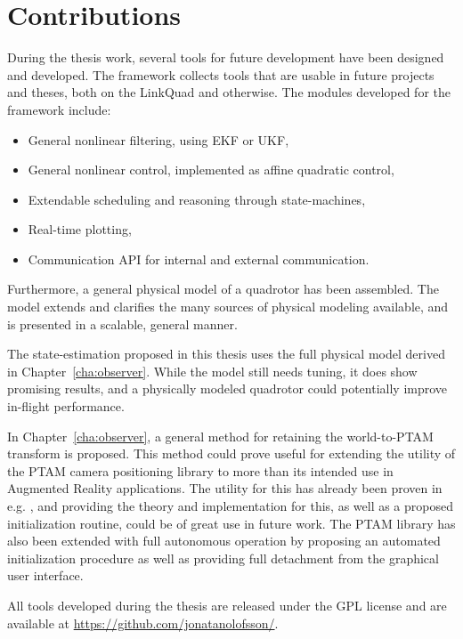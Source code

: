 \section{Contributions}
    During the thesis work, several tools for future development have been
    designed and developed. The \crap framework collects tools that are usable in future
    projects and theses, both on the LinkQuad and otherwise.
    The modules developed for the \crap framework include:
    \begin{itemize}
        \item General nonlinear filtering, using EKF or UKF,
        \item General nonlinear control, implemented as affine quadratic control,
        \item Extendable scheduling and reasoning through state-machines,
        \item Real-time plotting,
        \item Communication API for internal and external communication.
    \end{itemize}

    Furthermore, a general physical model of a quadrotor has been assembled.
    The model extends and clarifies the many sources of physical modeling
    available, and is presented in a scalable, general manner.

    The state-estimation proposed in this thesis uses the full physical model
    derived in Chapter~\ref{cha:observer}. While the model still needs
    tuning, it does show promising results, and a physically modeled
    quadrotor could potentially improve in-flight performance.

    In Chapter~\ref{cha:observer}, a general method for retaining
    the world-to-PTAM transform is proposed.
    This method could prove useful for extending the utility of the PTAM
    camera positioning library to more than its intended use in Augmented Reality applications.
    The utility for this has already been proven in e.g. \citep{weiss11monocular},
    and providing the theory and implementation for this, as well as a proposed
    initialization routine, could be of great use in future work.
    The PTAM library has also been extended with full autonomous operation by
    proposing an automated initialization procedure as well as providing
    full detachment from the graphical user interface.

    All tools developed during the thesis are released under the GPL license
    and are available at \url{https://github.com/jonatanolofsson/}.

